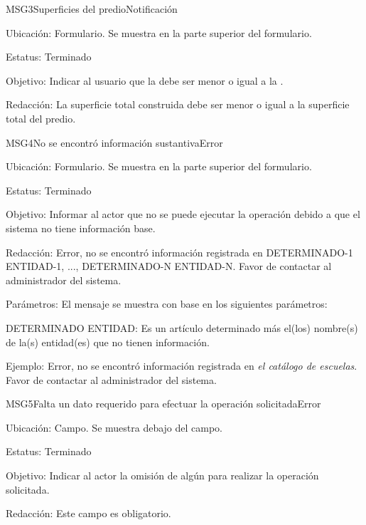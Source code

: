 \begin{mensaje}{MSG3}{Superficies del predio}{Notificación}
    \item[Ubicación:] Formulario. Se muestra en la parte superior del formulario.
    \item[Estatus:] Terminado
    \item[Objetivo:] Indicar al usuario que la  debe ser menor o igual a la .
    \item[Redacción:] La superficie total construida debe ser menor o igual a la superficie total del predio.
\end{mensaje}

\begin{mensaje}{MSG4}{No se encontró información sustantiva}{Error}
    \item[Ubicación:] Formulario. Se muestra en la parte superior del formulario.
    \item[Estatus:] Terminado
    \item[Objetivo:] Informar al actor que no se puede ejecutar la operación debido a que el sistema no tiene información base.
    \item[Redacción:] Error, no se encontró información registrada en DETERMINADO-1 ENTIDAD-1, ..., DETERMINADO-N ENTIDAD-N. Favor de contactar al administrador del sistema.
    \item[Parámetros:] El mensaje se muestra con base en los siguientes parámetros:
    \begin{Citemize}
	\item DETERMINADO ENTIDAD: Es un artículo determinado más el(los) nombre(s) de la(s) entidad(es) que no tienen información.
    \end{Citemize}
    \item[Ejemplo:] Error, no se encontró información registrada en {\em el catálogo de escuelas}. Favor de contactar al administrador del sistema.
\end{mensaje}

\begin{mensaje}{MSG5}{Falta un dato requerido para efectuar la operación solicitada}{Error}
    \item[Ubicación:] Campo. Se muestra debajo del campo.
    \item[Estatus:] Terminado
    \item[Objetivo:] Indicar al actor la omisión de algún  para realizar la operación solicitada.
    \item[Redacción:] Este campo es obligatorio.
\end{mensaje}

